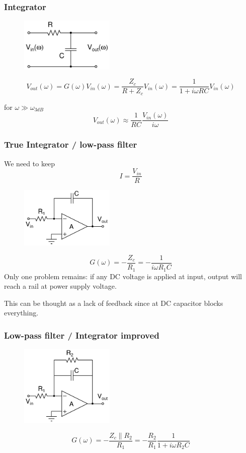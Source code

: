 \documentclass[beamer]{standalone}
\begin{document}
\begin{frame}
\frametitle{Integrator}
\begin{figure}
	\includegraphics[width=0.40\textwidth]{./schematics/rc_low_pass.pdf}
\end{figure}
\[
V_{out}(\omega)=G(\omega) V_{in}(\omega)=\frac{Z_c}{R+Z_c}V_{in}(\omega)=\frac{1}{1+i\omega R C}V_{in}(\omega)
\]
\begin{block}{for $\omega \gg \omega_{3dB}$}
\[
V_{out}(\omega) \approx \frac{1}{R C} \frac{V_{in}(\omega)}{i \omega}
\]
\end{block}
\end{frame}

\frame
{ \frametitle{True Integrator / low-pass filter}
We need to keep 
\[
I=\frac{V_{in}}{R}
\]
\begin{figure}
	\includegraphics[width=0.40\textwidth]{./schematics/integrator.pdf}
\end{figure}
\[
G(\omega)=-\frac{Z_c}{R_1}=-\frac{1}{i\omega R_1 C}
\]
Only one problem remains: if any DC voltage is applied at input, output
will reach a rail at power supply voltage.

This can be thought as a lack of feedback since at DC capacitor blocks
everything.
	}

\frame
{ \frametitle{Low-pass filter / Integrator improved }
\begin{figure}
	\includegraphics[width=0.40\textwidth]{./schematics/integrator_compensated.pdf}
\end{figure}
\[
G(\omega)=-\frac{Z_c\|R_2}{R_1}=-\frac{R_2}{R_1} \frac{1}{1+i\omega R_2 C}
\]
	}
\end{document}
